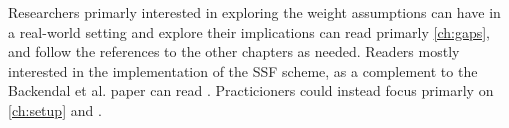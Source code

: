 Researchers primarly interested in exploring the weight assumptions can have in a real-world setting and explore their implications can read primarly \cref{ch:gaps}, and follow the references to the other chapters as needed.
Readers mostly interested in the implementation of the SSF scheme, as a complement to the Backendal et al. paper can read .
Practicioners could instead focus primarly on \cref{ch:setup} and .
